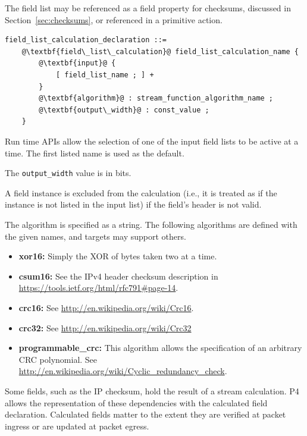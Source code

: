 \documentclass[12pt]{article}
\begin{document}
The field list may be referenced as a field property for checksums,
discussed in Section~\ref{sec:checksums}, or referenced in a primitive action.

\begin{lstlisting}[frame=single,backgroundcolor=\color{bnfgreen},escapechar=\@]
field_list_calculation_declaration ::=
    @\textbf{field\_list\_calculation}@ field_list_calculation_name {
        @\textbf{input}@ {
            [ field_list_name ; ] +
        }
        @\textbf{algorithm}@ : stream_function_algorithm_name ;
        @\textbf{output\_width}@ : const_value ;
    }
\end{lstlisting}

Run time APIs allow the selection of one of the input field lists to
be active at a time. The first listed name is used as the default.

The \texttt{output_width} value is in bits.

A field instance is excluded from the calculation (i.e., it is treated as 
if the instance is not listed in the input list) if the field's header 
is not valid.

The algorithm is specified as a string.  The following algorithms are
defined with the given names, and targets may support others.

\begin{itemize}
\item
\textbf{xor16:} Simply the XOR of bytes taken two at a time.
\item
\textbf{csum16:}  See the IPv4 header checksum description in \\
\url{https://tools.ietf.org/html/rfc791\#page-14}.
\item
\textbf{crc16:} See \url{http://en.wikipedia.org/wiki/Crc16}.
\item
\textbf{crc32:} See \url{http://en.wikipedia.org/wiki/Crc32}
\item
\textbf{programmable_crc:}  This algorithm allows the specification 
of an arbitrary CRC polynomial.  See
\url{http://en.wikipedia.org/wiki/Cyclic_redundancy_check}.
\end{itemize}


Some fields, such as the IP checksum, hold the result of a stream
calculation.  P4 allows the representation of these dependencies with
the calculated field declaration. Calculated fields matter to the
extent they are verified at packet ingress or are updated at packet
egress.
\end{document}
